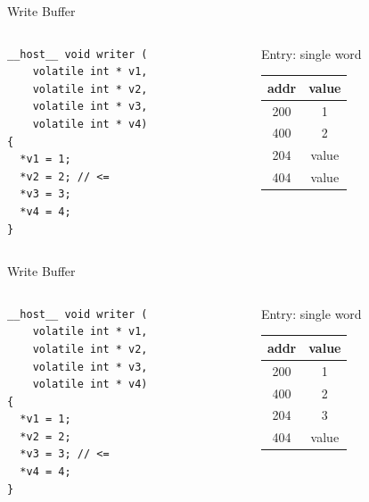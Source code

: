 \documentclass[aspectratio=169,compress]{beamer}
\begin{document}
\begin{frame}[fragile]{Write Buffer}{}
\centering
\begin{columns}[T]
	\begin{column}{0.4\textwidth}
\begin{lstlisting}[]
__host__ void writer (
    volatile int * v1,
    volatile int * v2,
    volatile int * v3,
    volatile int * v4)
{          
  *v1 = 1;
  *v2 = 2; // <=
  *v3 = 3;
  *v4 = 4;
}
\end{lstlisting}
\end{column}
\begin{column}{0.4\textwidth}
	\centering
	Entry: single word
	\begin{table}
		\begin{tabular}{| c | c |}
			\hline 
			addr & value \\
			\hline 
			200 & 1 \\
			\hline 
			400 & 2 \\
			\hline 
			\textcolor{NordBlack}{204} & \textcolor{NordBlack}{value} \\
			\hline 
			\textcolor{NordBlack}{404} & \textcolor{NordBlack}{value} \\
			\hline 
		\end{tabular}
	\end{table}
\end{column}
\end{columns}
\end{frame}


\begin{frame}[fragile]{Write Buffer}{}
\centering
\begin{columns}[T]
	\begin{column}{0.4\textwidth}
\begin{lstlisting}[]
__host__ void writer (
    volatile int * v1,
    volatile int * v2,
    volatile int * v3,
    volatile int * v4)
{          
  *v1 = 1;
  *v2 = 2;
  *v3 = 3; // <=
  *v4 = 4;
}
\end{lstlisting}
\end{column}
\begin{column}{0.4\textwidth}
	\centering
	Entry: single word
	\begin{table}
		\begin{tabular}{| c | c |}
			\hline 
			addr & value \\
			\hline 
			200 & 1 \\
			\hline 
			400 & 2 \\
			\hline 
			204 & 3 \\
			\hline 
			\textcolor{NordBlack}{404} & \textcolor{NordBlack}{value} \\
			\hline 
		\end{tabular}
	\end{table}
\end{column}
\end{columns}
\end{frame}
\end{document}
